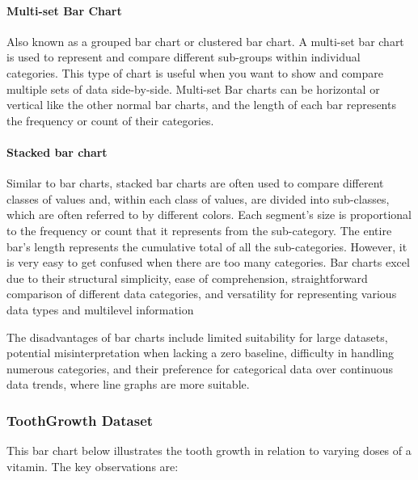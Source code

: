\documentclass{article}\usepackage[]{graphicx}\usepackage[]{xcolor}
\begin{document}
\paragraph{Multi-set Bar Chart}
Also known as a grouped bar chart or clustered bar chart. A multi-set bar chart is used to represent and compare different sub-groups within individual categories. This type of chart is useful when you want to show and compare multiple sets of data side-by-side.
Multi-set Bar charts can be horizontal or vertical like the other normal bar charts, and the length of each bar represents the frequency or count of their categories.
\paragraph{Stacked bar chart}
Similar to bar charts, stacked bar charts are often used to compare different classes of values and, within each class of values, are divided into sub-classes, which are often referred to by different colors. Each segment's size is proportional to the frequency or count that it represents from the sub-category. The entire bar's length represents the cumulative total of all the sub-categories.
However, it is very easy to get confused when there are too many categories.
Bar charts excel due to their structural simplicity, ease of comprehension, straightforward comparison of different data categories, and versatility for representing various data types and multilevel information

The disadvantages of bar charts include limited suitability for large datasets, potential misinterpretation when lacking a zero baseline, difficulty in handling numerous categories, and their preference for categorical data over continuous data trends, where line graphs are more suitable.
\subsubsection{ToothGrowth Dataset}


This bar chart below illustrates the tooth growth in relation to varying doses of a vitamin. The key observations are:
\end{document}
